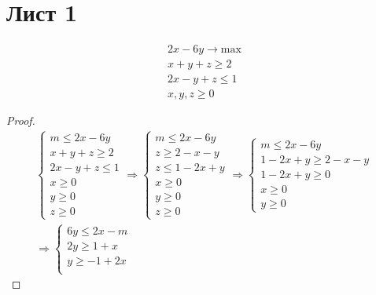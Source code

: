 \section{Лист 1}
\begin{prob}
    \begin{gather*}
        2x - 6y \to \mathrm{max}\\
        x + y + z \geqslant 2\\
        2x - y + z \leqslant 1\\
        x,y,z \geqslant 0
    \end{gather*}
\end{prob}

\begin{proof}
    \begin{gather*}
        \begin{cases}
            m \leqslant 2x - 6y\\
            x + y + z \geqslant 2\\
            2x - y + z \leqslant 1\\
            x \geqslant 0\\
            y \geqslant 0\\
            z \geqslant 0
        \end{cases}
        \Rightarrow
        \begin{cases}
            m \leqslant 2x - 6y\\
            z \geqslant 2 - x - y\\
            z \leqslant 1 - 2x + y\\
            x \geqslant 0\\
            y \geqslant 0\\
            z \geqslant 0
        \end{cases}
        \Rightarrow
        \begin{cases}
            m \leqslant 2x - 6y\\
            1 - 2x + y \geqslant 2 - x - y\\
            1 - 2x + y \geqslant 0\\
            x \geqslant 0\\
            y \geqslant 0
        \end{cases}\\
        \Rightarrow
        \begin{cases}
            6y \leqslant 2x - m\\
            2y \geqslant 1 + x\\
            y \geqslant -1 + 2x\\

\end{cases}
\end{gather*}
\end{proof}
